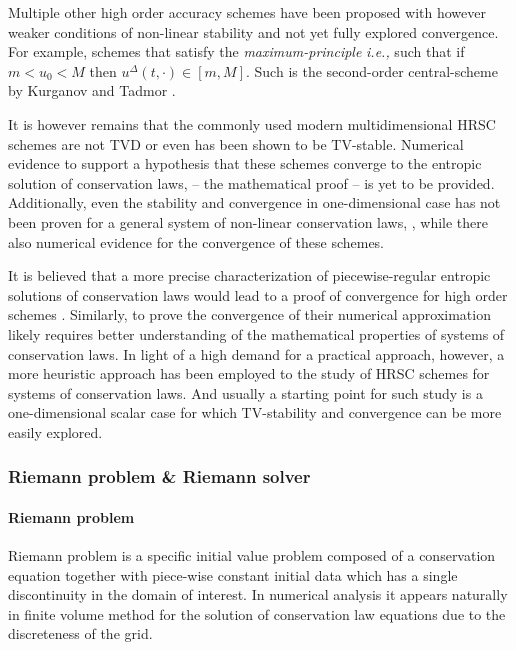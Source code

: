 Multiple other high order accuracy schemes have been proposed with however weaker conditions of non-linear stability and not yet fully explored convergence. 
For example, schemes that satisfy the \textit{maximum-principle} \textit{i.e.,} such that if $m < u_0 < M$ then $u^{\Delta}(t,\cdot)\in[m, M]$. 
Such is the second-order central-scheme by Kurganov and Tadmor \cite{Kurganov:2000}. 

It is however remains that the commonly used modern multidimensional HRSC schemes are not TVD or even has been shown to be TV-stable. 
Numerical evidence to support a hypothesis that these schemes converge to the entropic solution of conservation laws, -- the mathematical proof -- is yet to be provided. 
Additionally, even the stability and convergence in one-dimensional case has not been proven for a general system of non-linear conservation laws, \cite{LeVeque:2002}, while there also numerical evidence for the convergence of these schemes. 

It is believed that a more precise characterization of piecewise-regular entropic solutions of conservation laws would lead to a proof of convergence for high order schemes \cite{Tadmor1998}.
Similarly, to prove the convergence of their numerical approximation likely requires  better understanding of the mathematical properties of systems of conservation laws. 
In light of a high demand for a practical approach, however, a more heuristic approach has been employed to the study of HRSC schemes for systems of conservation laws. 
And usually a starting point for such study is a one-dimensional scalar case for which TV-stability and convergence can be more easily explored.



\subsubsection*{Riemann problem \& Riemann solver}


\paragraph{Riemann problem}

Riemann problem is a specific initial value problem composed of a conservation equation together with piece-wise constant initial data which has a single discontinuity in the domain of interest. 
In numerical analysis it appears naturally in finite volume method for the solution of conservation law equations due to the discreteness of the grid.

